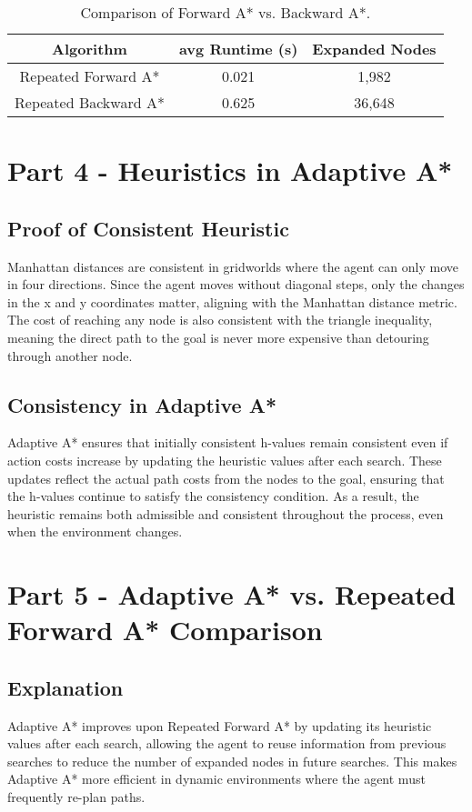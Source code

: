 \documentclass[12pt]{article}
\begin{document}
\begin{table}[H]
\centering
\begin{tabular}{|c|c|c|}
\hline
\textbf{Algorithm} & \textbf{avg Runtime (s)} & \textbf{Expanded Nodes} \\
\hline
Repeated Forward A* & 0.021 & 1,982 \\
Repeated Backward A* & 0.625 & 36,648 \\
\hline
\end{tabular}
\caption{Comparison of Forward A* vs. Backward A*.}
\end{table}


\section*{Part 4 - Heuristics in Adaptive A*}

\subsection*{Proof of Consistent Heuristic}
Manhattan distances are consistent in gridworlds where the agent can only move in four directions. Since the agent moves without diagonal steps, only the changes in the x and y coordinates matter, aligning with the Manhattan distance metric. The cost of reaching any node is also consistent with the triangle inequality, meaning the direct path to the goal is never more expensive than detouring through another node.

\subsection*{Consistency in Adaptive A*}
Adaptive A* ensures that initially consistent h-values remain consistent even if action costs increase by updating the heuristic values after each search. These updates reflect the actual path costs from the nodes to the goal, ensuring that the h-values continue to satisfy the consistency condition. As a result, the heuristic remains both admissible and consistent throughout the process, even when the environment changes.

\section*{Part 5 - Adaptive A* vs. Repeated Forward A* Comparison}

\subsection*{Explanation}
Adaptive A* improves upon Repeated Forward A* by updating its heuristic values after each search, allowing the agent to reuse information from previous searches to reduce the number of expanded nodes in future searches. This makes Adaptive A* more efficient in dynamic environments where the agent must frequently re-plan paths.
\end{document}
